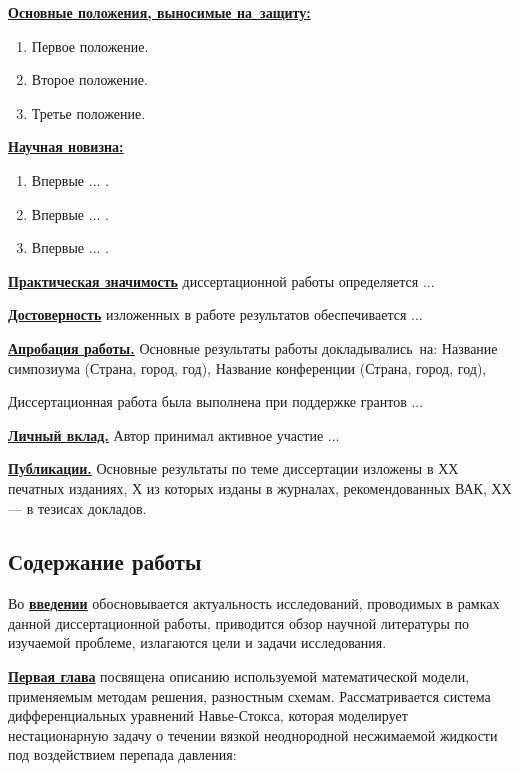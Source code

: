 \underline{\textbf{Основные положения, выносимые на~защиту:}}
\begin{enumerate}
 \item Первое положение.
 \item Второе положение.
 \item Третье положение.
\end{enumerate}

\underline{\textbf{Научная новизна:}}
\begin{enumerate}
 \item Впервые ... . 
 \item Впервые ... .
 \item Впервые ... . 
\end{enumerate}

\underline{\textbf{Практическая значимость}} диссертационной работы определяется ...

\underline{\textbf{Достоверность}} изложенных в работе результатов обеспечивается ...

\underline{\textbf{Апробация работы.}}
Основные результаты работы докладывались~на:
Название симпозиума (Страна, город, год),
Название конференции (Страна, город, год),

Диссертационная работа была выполнена при поддержке грантов ...

\underline{\textbf{Личный вклад.}} Автор принимал активное участие ...

\underline{\textbf{Публикации.}} Основные результаты по теме диссертации изложены в ХХ печатных изданиях, Х из которых изданы в журналах, рекомендованных ВАК, ХХ --- в тезисах докладов.


\subsection*{\Large Содержание работы}
Во \underline{\textbf{введении}} обосновывается актуальность исследований, проводимых в рамках данной диссертационной работы, приводится обзор научной литературы по изучаемой проблеме, излагаются цели и задачи исследования.

\underline{\textbf{Первая глава}} посвящена описанию используемой математической модели, применяемым методам решения, разностным схемам. Рассматривается система дифференциальных уравнений Навье-Стокса, которая моделирует нестационарную задачу о течении вязкой неоднородной несжимаемой жидкости под воздействием перепада давления:

